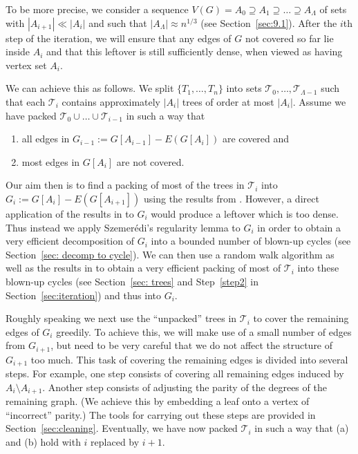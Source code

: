 \documentclass[a4paper, 11pt, reqno]{amsart}
\numberwithin{equation}{section}
\newcommand{\1}{{\rm 1\hspace*{-0.4ex}%
\rule{0.1ex}{1.52ex}\hspace*{0.2ex}}}
\newcommand{\cT}{\mathcal{T}}
\newcommand{\sm}{\setminus}
\newcounter{step}
\begin{document}
To be more precise, we consider a sequence $V(G)=A_0\supseteq A_1 \supseteq\ldots \supseteq A_{\Lambda}$ of sets with $|A_{i+1}|\ll |A_i|$ and such that $|A_\Lambda|\approx n^{1/3}$ (see Section~\ref{sec:9.1}). 
After the $i$th step of the iteration, we will ensure that any edges of $G$ not covered so far lie inside $A_i$
and that this leftover is still sufficiently dense, when viewed as having vertex set $A_i$.

We can achieve this as follows.
We split $\{T_1,\ldots,T_n\}$ into sets $\cT_0,\ldots,\cT_{\Lambda-1}$
such that each $\cT_i$ contains approximately $|A_i|$ trees of order at most $|A_i|$.
Assume we have packed $\cT_0\cup\ldots\cup\cT_{i-1}$
in such a way that 
\begin{enumerate}[label=(\alph*)]
	\item all edges in $G_{i-1}:=G[A_{i-1}]-E(G[A_{i}])$ are covered and
	\item most edges in $G[A_{i}]$ are not covered.
\end{enumerate}
Our aim then is to find a packing of most of the trees in $\cT_i$ into $G_i:=G[A_{i}]-E(G[A_{i+1}])$ using the results from \cite{KKOT16}. 
However, a direct application of the results in \cite{KKOT16} to $G_i$ 
would produce a leftover which is too dense.
Thus instead we apply Szemer\'{e}di's regularity lemma to $G_i$ in order to obtain a very efficient decomposition of $G_i$ into a bounded number of blown-up cycles (see Section~\ref{sec: decomp to cycle}). 
We can then use a random walk algorithm as well as the results in \cite{KKOT16} to obtain a very efficient packing of most of $\cT_i$ into these blown-up cycles (see Section~\ref{sec: trees} and Step~\ref{step2} in Section~\ref{sec:iteration}) and thus into $G_i$.

Roughly speaking we next use the ``unpacked'' trees in $\cT_i$ to cover the remaining edges of $G_i$ greedily. 
To achieve this, we will make use of a small number of edges from $G_{i+1}$,
but need to be very careful that we do not affect the structure of $G_{i+1}$ too much.
This task of covering the remaining edges is divided into several steps.
For example, one step consists of covering all remaining edges induced by $A_i\sm A_{i+1}$.
Another step consists of adjusting the parity of the degrees of the remaining graph.
(We achieve this by embedding a leaf onto a vertex of ``incorrect'' parity.)
The tools for carrying out these steps are provided in Section~\ref{sec:cleaning}.
Eventually, we have now packed $\cT_i$ in such a way that (a) and (b) hold with $i$ replaced by $i+1$.
\end{document}
